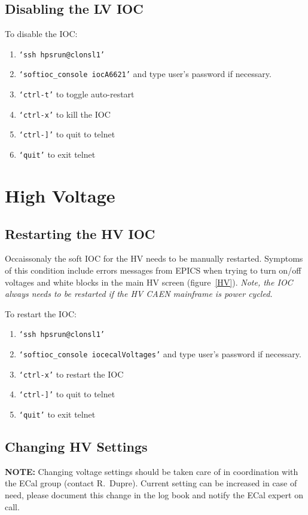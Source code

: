 \documentclass[12pt]{article}
\begin{document}
{\subsection{Disabling the LV IOC}\label{lviocstop}
   To disable the IOC:
   {\footnotesize
   \begin{enumerate}
       \item \texttt{`ssh hpsrun@clonsl1'}
       \item \texttt{`softioc\_console iocA6621'} and type user's password if necessary.
       \item \texttt{`ctrl-t'} to toggle auto-restart
       \item \texttt{`ctrl-x'} to kill the IOC
       \item \texttt{`ctrl-]'} to quit to telnet
       \item \texttt{`quit'} to exit telnet
   \end{enumerate}
   }

\newpage
   \section{High Voltage}
   \subsection{Restarting the HV IOC}
   Occaissonaly the soft IOC for the HV needs to be manually restarted.  Symptoms of this condition include errors messages from EPICS when trying to turn on/off voltages and white blocks in the main HV screen (figure~\ref{HV}).  {\em Note, the IOC always needs to be restarted if the HV CAEN mainframe is power cycled.}

   To restart the IOC:
   {\footnotesize
   \begin{enumerate}
       \item \texttt{`ssh hpsrun@clonsl1'}
       \item \texttt{`softioc\_console iocecalVoltages'} and type user's password if necessary.
       \item \texttt{`ctrl-x'} to restart the IOC
       \item \texttt{`ctrl-]'} to quit to telnet
       \item \texttt{`quit'} to exit telnet
   \end{enumerate}
   }
   
   \subsection{Changing HV Settings}
      {\bf NOTE:} Changing voltage settings should be taken care of in coordination with the ECal group (contact R.~Dupre). Current setting can be increased in case of need, please document this change in the log book and notify the ECal expert on call.

}
\end{document}
